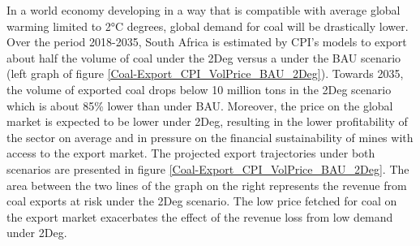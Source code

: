 \documentclass[12pt,english]{article}
\begin{document}
In a world economy developing in a way that is compatible with average global warming limited to 2°C degrees, global demand for coal will be drastically lower. Over the period 2018-2035, South Africa is estimated by CPI's models to export about half the volume of coal under the 2Deg versus a under the BAU scenario (left graph of figure \ref{Coal-Export_CPI_VolPrice_BAU_2Deg}). %
Towards 2035, the volume of exported coal drops below 10 million tons in the 2Deg scenario which is about 85\% lower than under BAU. Moreover, the price on the global market is expected to be lower under 2Deg, resulting in the lower profitability of the sector on average and in pressure %
on the financial sustainability of mines with access to the export market. %
The projected export trajectories under both scenarios are presented in figure \ref{Coal-Export_CPI_VolPrice_BAU_2Deg}. The area between the two lines of the graph on the right represents the revenue from coal exports at risk under the 2Deg scenario. The low price fetched for coal on the export market exacerbates the effect of the revenue loss from low demand under 2Deg. 
\end{document}
